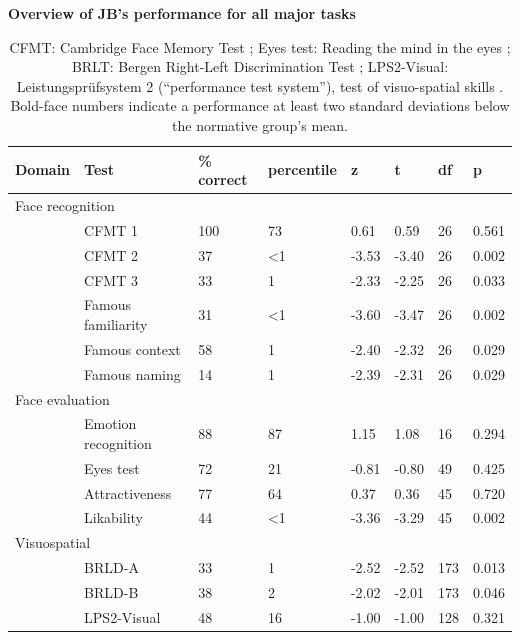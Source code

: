 \documentclass[fleqn,10pt]{SelfArx} %
\begin{document}
\begin{table}[htbp]
	
	\renewcommand{\familydefault}{\sfdefault}\normalfont\renewcommand{}
	\centering
	\caption{\bf Overview of JB's performance for all major tasks}
	\small

	\small
	\begin{tabular}{llllllll}
		\hline
			Domain & Test & \% correct & percentile & z & t & df & p \\
		\hline
		\multicolumn{2}{l}{Face recognition} \\
		& CFMT 1 &  100 &         73 &  0.61 &  0.59 &   26 &  0.561  \\
		& CFMT 2 &         37 &         <1 & -3.53 & -3.40 &   26 &  0.002 \\
		& CFMT 3 &         33 &          1 & -2.33 & -2.25 &   26 &  0.033  \\
		& Famous familiarity &         31 &         <1 & -3.60 & -3.47 &   26 &  0.002 \\
		& Famous context &         58 &          1 & -2.40 & -2.32 &   26 &  0.029 \\
		& Famous naming &         14 &          1 & -2.39 & -2.31 &   26 &  0.029 \\
		\multicolumn{2}{l}{Face evaluation} \\
		& Emotion recognition &         88 &         87 &  1.15 &  1.08 &   16 &  0.294  \\
		& Eyes test &         72 &         21 & -0.81 & -0.80 &   49 &  0.425  \\
		& Attractiveness &         77 &         64 &  0.37 &  0.36 &   45 &  0.720 \\
		& Likability &         44 &         <1 & -3.36 & -3.29 &   45 &  0.002 \\
		\multicolumn{2}{l}{Visuospatial} \\
		& BRLD-A &         33 &          1 & -2.52 & -2.52 &  173 &  0.013 \\
		& BRLD-B &         38 &          2 & -2.02 & -2.01 &  173 &  0.046 \\
		& LPS2-Visual &         48 &         16 & -1.00 & -1.00 &  128 &  0.321 \\
		\hline
	\end{tabular}

	\parbox{12cm}{\caption*{CFMT: Cambridge Face Memory Test \citep{Duchaine_2006cfmt}; Eyes test: Reading the mind in the eyes \citep{Baron_Cohen_2001}; BRLT: Bergen Right-Left Discrimination Test \citep{Ofte_2002}; LPS2-Visual: Leistungsprüfsystem 2 (“performance test system”), test of visuo-spatial skills \citep{Horn}. Bold-face numbers indicate a performance at least two standard deviations below the normative group's mean.} }
	\label{tab:summary}
\end{table}
\end{document}
